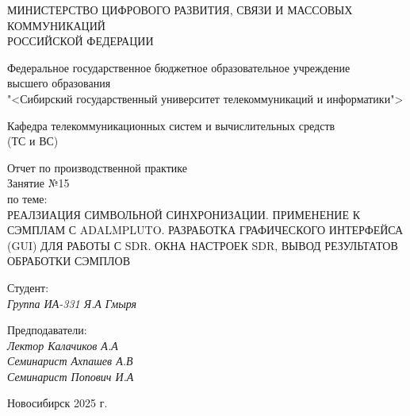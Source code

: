 \thispagestyle{empty}

\begin{center}
    МИНИСТЕРСТВО ЦИФРОВОГО РАЗВИТИЯ, СВЯЗИ И МАССОВЫХ КОММУНИКАЦИЙ \\ РОССИЙСКОЙ ФЕДЕРАЦИИ

    \vspace{20pt}

    Федеральное государственное бюджетное образовательное учреждение  \\  высшего образования \\
    "<Сибирский государственный университет телекоммуникаций и информатики"> \\

    \vspace{20pt}

    Кафедра телекоммуникационных систем и вычислительных средств \\  (ТС и ВС)
\end{center}

\vfill

\begin{center}
    Отчет по производственной практике \\  
    Занятие №15 \\

    \vspace{20pt}
    по теме: \\
    \uppercase{Реалзиация символьной синхронизации. Применение к сэмплам с AdalmPluto.
Разработка графического интерфейса (GUI) для работы с SDR. Окна настроек SDR, вывод результатов обработки сэмплов}
\end{center}

\vfill

    \noindent Студент: \\
    \textit{Группа ИА-331 \hfill Я.А Гмыря}

    \vspace{20pt}

    \noindent Предподаватели: \\
    \textit{Лектор \hfill Калачиков А.А} \\
    \textit{Семинарист \hfill Ахпашев А.В} \\
    \textit{Семинарист \hfill Попович И.А}

\vfill

\begin{center}
    Новосибирск 2025 г.
\end{center}